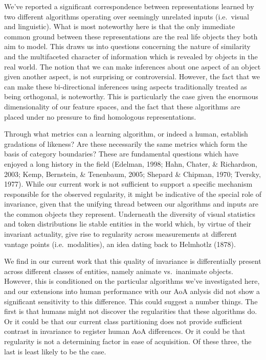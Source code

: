 \documentclass[10pt, letterpaper]{article}
\begin{document}
We've reported a significant correspondence between representations
learned by two different algorithms operating over seemingly unrelated
inputs (i.e.~visual and linguistic). What is most noteworthy here is
that the only immediate common ground between these representations are
the real life objects they both aim to model. This draws us into
questions concerning the nature of similarity and the multifaceted
character of information which is revealed by objects in the real world.
The notion that we can make inferences about one aspect of an object
given another aspect, is not surprising or controversial. However, the
fact that we can make these bi-directional inferences using aspects
traditionally treated as being orthogonal, is noteworthy. This is
particularly the case given the enormous dimensionality of our feature
spaces, and the fact that these algorithms are placed under no pressure
to find homologous representations.

Through what metrics can a learning algorithm, or indeed a human,
establish gradations of likeness? Are these necessarily the same metrics
which form the basis of category boundaries? These are fundamental
questions which have enjoyed a long history in the field (Edelman, 1998;
Hahn, Chater, \& Richardson, 2003; Kemp, Bernstein, \& Tenenbaum, 2005;
Shepard \& Chipman, 1970; Tversky, 1977). While our current work is not
sufficient to support a specific mechanism responsible for the observed
regularity, it might be indicative of the special role of invariance,
given that the unifying thread between our algorithms and inputs are the
common objects they represent. Underneath the diversity of visual
statistics and token distributions lie stable entities in the world
which, by virtue of their invariant actuality, give rise to regularity
across measurements at different vantage points (i.e.~modalities), an
idea dating back to Helmhotlz (1878).

We find in our current work that this quality of invariance is
differentially present across different classes of entities, namely
animate vs.~inanimate objects. However, this is conditioned on the
particular algorithms we've investigated here, and our extensions into
human performance with our AoA anlysis did not show a significant
sensitivity to this difference. This could suggest a number things. The
first is that humans might not discover the regularities that these
algorithms do. Or it could be that our current class partitioning does
not provide sufficient contrast in invariance to register human AoA
differences. Or it could be that regularity is not a determining factor
in ease of acquisition. Of these three, the last is least likely to be
the case.
\end{document}
